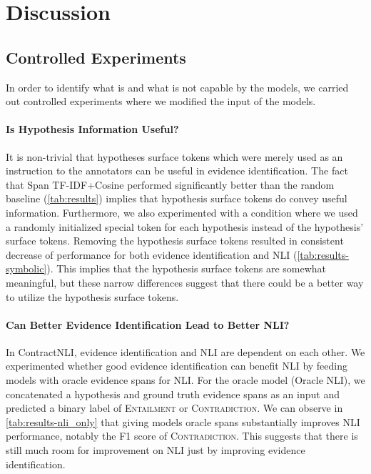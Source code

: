 \section{Discussion}\label{sec:discussion}

\subsection{Controlled Experiments}\label{sec:discussion-additional_experiments}

In order to identify what is and what is not capable by the models, we carried out controlled experiments where we modified the input of the models.

\paragraph{Is Hypothesis Information Useful?}

It is non-trivial that hypotheses surface tokens which were merely used as an instruction to the annotators can be useful in evidence identification.
The fact that Span TF-IDF+Cosine performed significantly better than the random baseline (\cref{tab:results}) implies that hypothesis surface tokens do convey useful information.
Furthermore, we also experimented with a condition where we used a randomly initialized special token for each hypothesis instead of the hypothesis' surface tokens.
Removing the hypothesis surface tokens resulted in consistent decrease of performance for both evidence identification and NLI (\cref{tab:results-symbolic}).
This implies that the hypothesis surface tokens are somewhat meaningful, but these narrow differences suggest that there could be a better way to utilize the hypothesis surface tokens.



\paragraph{Can Better Evidence Identification Lead to Better NLI?}

In ContractNLI, evidence identification and NLI are dependent on each other.
We experimented whether good evidence identification can benefit NLI by feeding models with oracle evidence spans for NLI.
For the oracle model (Oracle NLI), we concatenated a hypothesis and ground truth evidence spans as an input and predicted a binary label of \textsc{Entailment} or \textsc{Contradiction}.
We can observe in \cref{tab:results-nli_only} that giving models oracle spans substantially improves NLI performance, notably the F1 score of \textsc{Contradiction}.
This suggests that there is still much room for improvement on NLI just by improving evidence identification.

